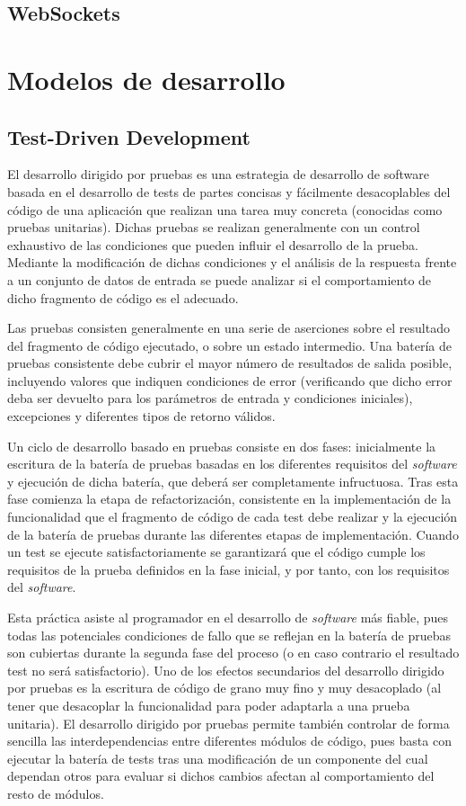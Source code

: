 \subsection{WebSockets}

\section{Modelos de desarrollo}
\subsection{Test-Driven Development}
\label{tdd}

El desarrollo dirigido por pruebas es una estrategia de desarrollo de software basada en el desarrollo de tests de partes concisas y fácilmente desacoplables del código de una aplicación que realizan una tarea muy concreta (conocidas como pruebas unitarias). Dichas pruebas se realizan generalmente con un control exhaustivo de las condiciones que pueden influir el desarrollo de la prueba. Mediante la modificación de dichas condiciones y el análisis de la respuesta frente a un conjunto de datos de entrada se puede analizar si el comportamiento de dicho fragmento de código es el adecuado.

Las pruebas consisten generalmente en una serie de aserciones sobre el resultado del fragmento de código ejecutado, o sobre un estado intermedio. Una batería de pruebas consistente debe cubrir el mayor número de resultados de salida posible, incluyendo valores que indiquen condiciones de error (verificando que dicho error deba ser devuelto para los parámetros de entrada y condiciones iniciales), excepciones y diferentes tipos de retorno válidos.

Un ciclo de desarrollo basado en pruebas consiste en dos fases: inicialmente la escritura de la batería de pruebas basadas en los diferentes requisitos del \textit{software} y ejecución de dicha batería, que deberá ser completamente infructuosa. Tras esta fase comienza la etapa de refactorización, consistente en la implementación de la funcionalidad que el fragmento de código de cada test debe realizar y la ejecución de la batería de pruebas durante las diferentes etapas de implementación. Cuando un test se ejecute satisfactoriamente se garantizará que el código cumple los requisitos de la prueba definidos en la fase inicial, y por tanto, con los requisitos del \textit{software}.

Esta práctica asiste al programador en el desarrollo de \textit{software} más fiable, pues todas las potenciales condiciones de fallo que se reflejan en la batería de pruebas son cubiertas durante la segunda fase del proceso (o en caso contrario el resultado test no será satisfactorio). Uno de los efectos secundarios del desarrollo dirigido por pruebas es la escritura de código de grano muy fino y muy desacoplado (al tener que desacoplar la funcionalidad para poder adaptarla a una prueba unitaria). El desarrollo dirigido por pruebas permite también controlar de forma sencilla las interdependencias entre diferentes módulos de código, pues basta con ejecutar la batería de tests tras una modificación de un componente del cual dependan otros para evaluar si dichos cambios afectan al comportamiento del resto de módulos.

